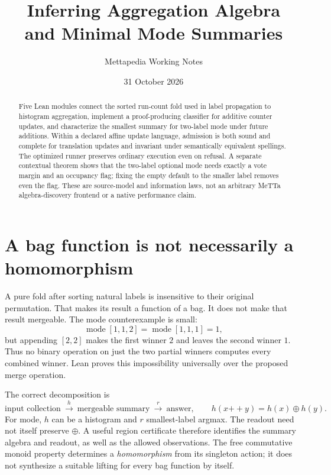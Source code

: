 \documentclass[11pt,a4paper]{article}
\title{Inferring Aggregation Algebra\\and Minimal Mode Summaries}
\author{Mettapedia Working Notes}
\date{31 October 2026}
\begin{document}
\maketitle

\begin{abstract}
Five Lean modules connect the sorted run-count fold used in label propagation
to histogram aggregation, implement a proof-producing classifier for additive
counter updates, and characterize the smallest summary for two-label mode under
future additions. Within a declared affine update language, admission is both
sound and complete for translation updates and invariant under semantically
equivalent spellings. The optimized runner preserves ordinary execution even
on refusal. A separate contextual theorem shows that the two-label optional
mode needs exactly a vote margin and an occupancy flag; fixing the empty
default to the smaller label removes even the flag. These are source-model and
information laws, not an arbitrary MeTTa algebra-discovery frontend or a native
performance claim.
\end{abstract}

\section{A bag function is not necessarily a homomorphism}

A pure fold after sorting natural labels is insensitive to their original
permutation. That makes its result a function of a bag. It does not make that
result mergeable. The mode counterexample is small:
\[
 \operatorname{mode}[1,1,2]=\operatorname{mode}[1,1,1]=1,
\]
but appending $[2,2]$ makes the first winner $2$ and leaves the second winner
$1$. Thus no binary operation on just the two partial winners computes every
combined winner. Lean proves this impossibility universally over the proposed
merge operation.

The correct decomposition is
\[
 \text{input collection}\ \xrightarrow{\ h\ }\ \text{mergeable summary}
 \ \xrightarrow{\ r\ }\ \text{answer},
 \qquad h(x\mathbin{+\!+}y)=h(x)\oplus h(y).
\]
For mode, $h$ can be a histogram and $r$ smallest-label argmax. The readout
need not itself preserve $\oplus$. A useful region certificate therefore
identifies the summary algebra and readout, as well as the allowed observations.
The free commutative monoid property determines a \emph{homomorphism} from its
singleton action; it does not synthesize a suitable lifting for every bag
function by itself.
\end{document}
